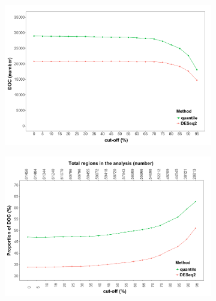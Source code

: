 \begin{figure}[htbp]
\centering
\begin{subfigure}{0.48\textwidth}
\centering
\includegraphics[width=\textwidth]{./Results1/pdfs/ATAC_Core_CD4vsCD14_DOC_FDR_01_vs_cutoffs_quantile_DESeq2_only}
\caption{\textbf{}}
\end{subfigure}%
\begin{subfigure}{0.45\textwidth}
\centering
\includegraphics[width=\textwidth]{./Results1/pdfs/ATAC_Core_CD4vsCD14_proportion_DOC_FDR_01_vs_cutoffs_quantile_DESeq2_only}
\caption{\textbf{}}
\end{subfigure}
\begin{subfigure}{0.5\textwidth}
\centering

\end{subfigure}
\end{figure}
